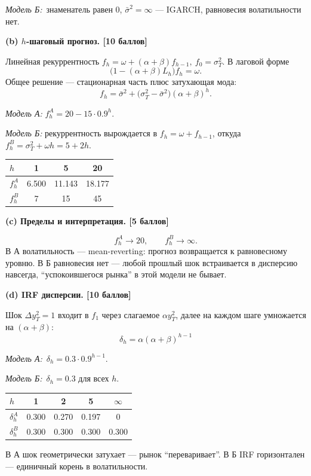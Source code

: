 \documentclass[11pt,a4paper]{article}
\newcommand{\step}[1]{\medskip\noindent\textbf{#1}\par\nobreak\vspace{2pt}}
\begin{document}
\emph{Модель Б:}\ знаменатель равен 0, \(\bar\sigma^2=\infty\) --- IGARCH, равновесия волатильности нет.

\step{(b) \(h\)-шаговый прогноз. \hfill [10 баллов]}
Линейная рекуррентность \(f_h=\omega+(\alpha+\beta)f_{h-1},\ f_0=\sigma^2_T\). В лаговой форме
\[
\bigl(1-(\alpha+\beta)L_h\bigr)f_h=\omega.
\]
Общее решение ---
стационарная часть плюс затухающая мода:
\[
f_h=\bar\sigma^2+\bigl(\sigma^2_T-\bar\sigma^2\bigr)(\alpha+\beta)^{h}.
\]

\emph{Модель А:} \(f_h^A=20-15\cdot 0.9^{h}\).

\emph{Модель Б:} рекуррентность вырождается в \(f_h=\omega+f_{h-1}\), откуда \(f_h^B=\sigma^2_T+\omega h=5+2h\).

\begin{center}
\begin{tabular}{@{}l|ccc@{}}
\toprule
\(h\) & 1 & 5 & 20 \\
\midrule
\(f_h^A\) & 6.500 & 11.143 & 18.177 \\
\(f_h^B\) & 7\phantom{.000} & 15\phantom{.000} & 45\phantom{.000} \\
\bottomrule
\end{tabular}
\end{center}

\step{(c) Пределы и интерпретация. \hfill [5 баллов]}
\[
f_h^A\to 20,\qquad f_h^B\to\infty.
\]
В А волатильность --- mean-reverting: прогноз возвращается к равновесному уровню. В Б равновесия нет --- любой прошлый шок встраивается в дисперсию навсегда, ``успокоившегося рынка'' в этой модели не бывает.

\step{(d) IRF дисперсии. \hfill [10 баллов]}
Шок \(\Delta y_T^2=1\) входит в \(f_1\) через слагаемое \(\alpha y_T^2\), далее на каждом шаге умножается на \((\alpha+\beta)\):
\[
\boxed{\;\delta_h=\alpha(\alpha+\beta)^{h-1}\;}
\]

\emph{Модель А:}\ \(\delta_h=0.3\cdot 0.9^{h-1}\).

\emph{Модель Б:}\ \(\delta_h=0.3\) для всех \(h\).

\begin{center}
\begin{tabular}{@{}l|cccc@{}}
\toprule
\(h\) & 1 & 2 & 5 & \(\infty\) \\
\midrule
\(\delta_h^A\) & 0.300 & 0.270 & 0.197 & 0\phantom{.000} \\
\(\delta_h^B\) & 0.300 & 0.300 & 0.300 & 0.300 \\
\bottomrule
\end{tabular}
\end{center}

В А шок геометрически затухает --- рынок ``переваривает''. В Б IRF горизонтален --- единичный корень в волатильности.
\end{document}
